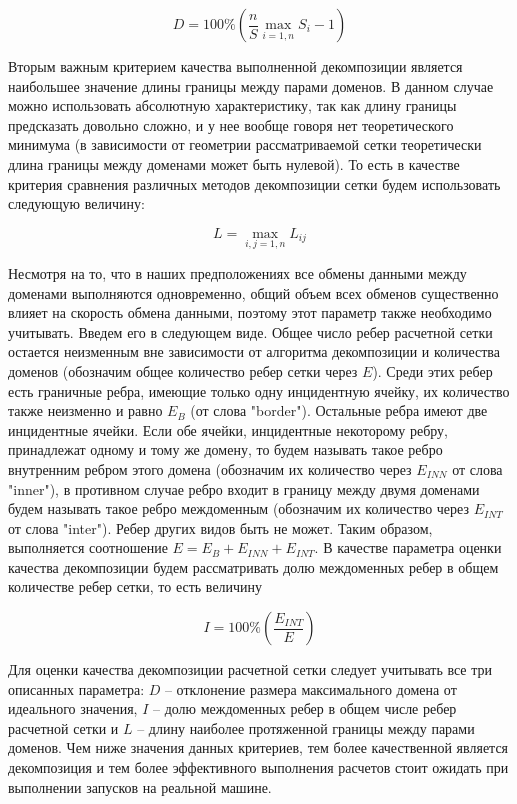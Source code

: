 \documentclass[
11pt,%
tightenlines,%
twoside,%
onecolumn,%
nofloats,%
nobibnotes,%
nofootinbib,%
superscriptaddress,%
noshowpacs,%
centertags]%
{revtex4}
\begin{document}
\begin{equation}
D = 100 \% \left( \frac{n}{S} \max_{i=1,n}{S_i} - 1 \right)
\end{equation}

Вторым важным критерием качества выполненной декомпозиции является наибольшее значение длины границы между парами доменов.
В данном случае можно использовать абсолютную характеристику, так как длину границы предсказать довольно сложно, и у нее вообще говоря нет теоретического минимума (в зависимости от геометрии рассматриваемой сетки теоретически длина границы между доменами может быть нулевой).
То есть в качестве критерия сравнения различных методов декомпозиции сетки будем использовать следующую величину:

\begin{equation}
L = \max_{i,j=1,n}{L_{ij}}
\end{equation}

Несмотря на то, что в наших предположениях все обмены данными между доменами выполняются одновременно, общий объем всех обменов существенно влияет на скорость обмена данными, поэтому этот параметр также необходимо учитывать.
Введем его в следующем виде.
Общее число ребер расчетной сетки остается неизменным вне зависимости от алгоритма декомпозиции и количества доменов (обозначим общее количество ребер сетки через $E$).
Среди этих ребер есть граничные ребра, имеющие только одну инцидентную ячейку, их количество также неизменно и равно $E_B$ (от слова "border").
Остальные ребра имеют две инцидентные ячейки.
Если обе ячейки, инцидентные некоторому ребру, принадлежат одному и тому же домену, то будем называть такое ребро внутренним ребром этого домена (обозначим их количество через $E_{INN}$ от слова "inner"), в противном случае ребро входит в границу между двумя доменами будем называть такое ребро междоменным (обозначим их количество через $E_{INT}$ от слова "inter").
Ребер других видов быть не может.
Таким образом, выполняется соотношение $E = E_B + E_{INN} + E_{INT}$.
В качестве параметра оценки качества декомпозиции будем рассматривать долю междоменных ребер в общем количестве ребер сетки, то есть величину

\begin{equation}
I = 100 \% \left( \frac{E_{INT}}{E} \right)
\end{equation}
	  
Для оценки качества декомпозиции расчетной сетки следует учитывать все три описанных параметра: $D$ -- отклонение размера максимального домена от идеального значения, $I$ -- долю междоменных ребер в общем числе ребер расчетной сетки и $L$ -- длину наиболее протяженной границы между парами доменов.
Чем ниже значения данных критериев, тем более качественной является декомпозиция и тем более эффективного выполнения расчетов стоит ожидать при выполнении запусков на реальной машине.
\end{document}
